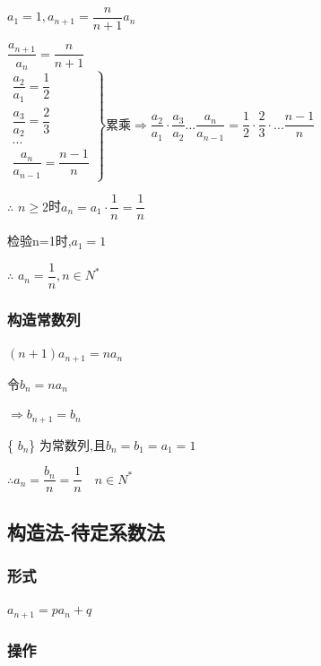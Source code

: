 \documentclass[10pt,cn]{elegantbook}
\begin{document}
     $a_{1}=1,a_{n+1}= \dfrac{n}{n+1} a_{n}$
     
     \begin{tcolorbox}[colback=yellow!10!white, colframe=red!50!black]
     	$\dfrac{a_{n+1}}{a_{n}}=\dfrac{n}{n+1}$
     	\\
     	$
     	\left.
     	\begin{aligned}
     		\dfrac{a_{2}}{a_{1}}= \dfrac{1}{2} \\
     		\dfrac{a_{3}}{a_{2}}= \dfrac{2}{3} \\
     		... \\
     		\dfrac{a_{n}}{a_{n-1}}= \dfrac{n-1}{n}
     	\end{aligned}
     	\right\}
     	\text{累乘} \Rightarrow \dfrac{a_{2}}{a_{1}} \cdot \dfrac{a_{3}}{a_{2}}...\dfrac{a_{n}}{a_{n-1}} = \dfrac{1}{2} \cdot \dfrac{2}{3} \cdot ... \dfrac{n-1}{n}
     	$
     	
     	
     	$ \therefore$ $n \geq 2$时$a_{n}=a_{1} \cdot \dfrac{1}{n} =\dfrac{1}{n}$
     	
     	检验\quad n=1时,$a_{1}=1$
     	
     	$ \therefore $ $a_{n}=\dfrac{1}{n} ,n \in N^{*}$
     \end{tcolorbox}
     
      \subsubsection{构造常数列}
      
      $(n+1)a_{n+1}=n a_{n}$
      
      令$b_{n}=n a_{n}$
      
      $\Rightarrow b_{n+1}=b_{n}$
      
      \{ $b_{n}$\} 为常数列,且$b_{n}=b_{1}=a_{1}=1$
      
      $ \therefore a_{n}=\dfrac{b_{n}}{n}=\dfrac{1}{n} \quad  n\in N^{*}$
      
         \subsection{构造法-待定系数法}
      \subsubsection*{形式}
      $a_{n+1}=p a_{n} + q$
      
       \subsubsection*{操作}
       
\end{document}
